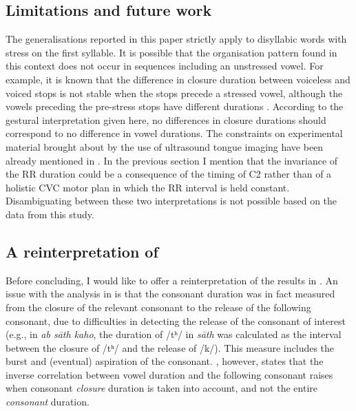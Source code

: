 \documentclass[preprint]{JASAnew}
\begin{document}
\hypertarget{limitations-and-future-work}{%
\subsection{Limitations and future
work}\label{limitations-and-future-work}}

The generalisations reported in this paper strictly apply to disyllabic
words with stress on the first syllable. It is possible that the
organisation pattern found in this context does not occur in sequences
including an unstressed vowel. For example, it is known that the
difference in closure duration between voiceless and voiced stops is not
stable when the stops precede a stressed vowel, although the vowels
preceding the pre-stress stops have different durations
\citep{davis1989}. According to the gestural interpretation given here,
no differences in closure durations should correspond to no difference
in vowel durations. The constraints on experimental material brought
about by the use of ultrasound tongue imaging have been already
mentioned in . In the previous section I mention that
the invariance of the RR duration could be a consequence of the timing
of C2 rather than of a holistic CVC motor plan in which the RR interval
is held constant. Disambiguating between these two interpretations is
not possible based on the data from this study.

\hypertarget{a-reinterpretation-of-maddieson1976}{%
\subsection{\texorpdfstring{A reinterpretation of
\citet{maddieson1976}}{A reinterpretation of @maddieson1976}}\label{a-reinterpretation-of-maddieson1976}}

Before concluding, I would like to offer a reinterpretation of the
results in \citet{maddieson1976}. An issue with the analysis in
\citet{maddieson1976} is that the consonant duration was in fact
measured from the closure of the relevant consonant to the release of
the following consonant, due to difficulties in detecting the release of
the consonant of interest (e.g., in \emph{ab sāth kaho}, the duration of
/tʰ/ in \emph{sāth} was calculated as the interval between the closure
of /tʰ/ and the release of /k/). This measure includes the burst and
(eventual) aspiration of the consonant. \citet{slis1969a}, however,
states that the inverse correlation between vowel duration and the
following consonant raises when consonant \emph{closure} duration is
taken into account, and not the entire \emph{consonant} duration.
\end{document}
